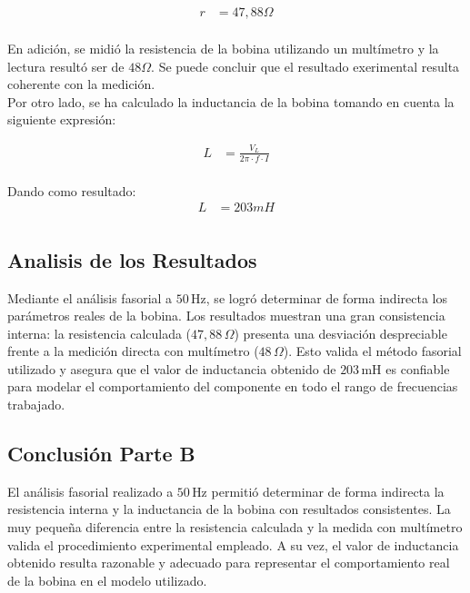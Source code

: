 \begin{align*}
    r &=  47,88 \Omega \\
\end{align*}

En adición, se midió la resistencia de la bobina utilizando un multímetro y la lectura resultó ser de  $48 \Omega$. Se puede concluir que el resultado exerimental resulta coherente con la medición. \\

Por otro lado, se ha calculado la inductancia de la bobina tomando en cuenta la siguiente expresión: 

\begin{align*}
    L &=  \frac{V_L}{2\pi\cdot f \cdot  I} \\
\end{align*}

Dando como resultado:
\begin{align*}
    L &=  203 mH \\
\end{align*}

\subsection{Analisis de los Resultados}

Mediante el análisis fasorial a \(50\,\text{Hz}\), se logró determinar de forma indirecta los parámetros reales de la bobina. Los resultados muestran una gran consistencia interna: la resistencia calculada (\(47{,}88\,\Omega\)) presenta una desviación despreciable frente a la medición directa con multímetro (\(48\,\Omega\)). Esto valida el método fasorial utilizado y asegura que el valor de inductancia obtenido de \(203\,\text{mH}\) es confiable para modelar el comportamiento del componente en todo el rango de frecuencias trabajado.

\subsection{Conclusión Parte B}

El análisis fasorial realizado a \(50\,\text{Hz}\) permitió determinar de forma indirecta la resistencia interna y la inductancia de la bobina con resultados consistentes. La muy pequeña diferencia entre la resistencia calculada y la medida con multímetro valida el procedimiento experimental empleado. A su vez, el valor de inductancia obtenido resulta razonable y adecuado para representar el comportamiento real de la bobina en el modelo utilizado.

\newpage
